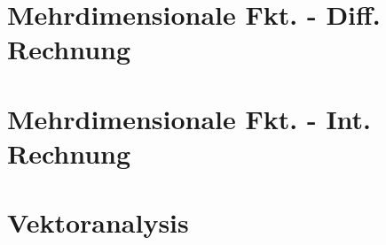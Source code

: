 \documentclass[numerate]{cheatsheet}
\begin{document}
    \section{Mehrdimensionale Fkt. - Diff. Rechnung}
        
        
        
        
        
        
        
        
        
        \vfill \null \columnbreak
        
    \section{Mehrdimensionale Fkt. - Int. Rechnung}
        
        
        
        
        
        
        
        
        
        
        \vfill \null \columnbreak

    \section{Vektoranalysis}
        
        
        
        
        
        \newpage
\end{document}
